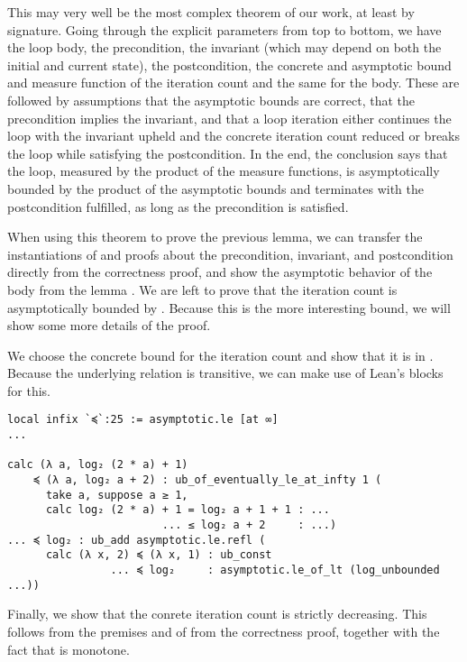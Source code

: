 This may very well be the most complex theorem of our work, at least by
signature. Going through the explicit parameters from top to bottom, we have the
loop body, the precondition, the invariant (which may depend on both the initial
and current state), the postcondition, the concrete and asymptotic bound and
measure function of the iteration count and the same for the body. These are
followed by assumptions that the asymptotic bounds are correct, that the
precondition implies the invariant, and that a loop iteration either continues
the loop with the invariant upheld and the concrete iteration count reduced or
breaks the loop while satisfying the postcondition. In the end, the conclusion says
that the loop, measured by the product of the measure functions, is
asymptotically bounded by the product of the asymptotic bounds and terminates
with the postcondition fulfilled, as long as the precondition is satisfied.

When using this theorem to prove the previous lemma, we can transfer the
instantiations of and proofs about the precondition, invariant, and
postcondition directly from the correctness proof, and show the asymptotic
behavior of the body from the lemma . We are left to prove
that the iteration count is asymptotically bounded by . Because this
is the more interesting bound, we will show some more details of the proof.

We choose the concrete bound  for the iteration
count and show that it is in . Because the underlying relation
 is transitive, we can make use of Lean's  blocks
for this.

\begin{verbatim}
local infix `≼`:25 := asymptotic.le [at ∞]
...

calc (λ a, log₂ (2 * a) + 1)
    ≼ (λ a, log₂ a + 2) : ub_of_eventually_le_at_infty 1 (
      take a, suppose a ≥ 1,
      calc log₂ (2 * a) + 1 = log₂ a + 1 + 1 : ...
                        ... ≤ log₂ a + 2     : ...)
... ≼ log₂ : ub_add asymptotic.le.refl (
      calc (λ x, 2) ≼ (λ x, 1) : ub_const
                ... ≼ log₂     : asymptotic.le_of_lt (log_unbounded ...))
\end{verbatim}

Finally, we show that the conrete iteration count is strictly decreasing. This
follows from the premises  and  of  from the correctness proof, together with the fact
that  is monotone.

